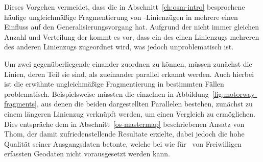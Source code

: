 \documentclass[../main/thesis.tex]{subfiles}
\begin{document}
Dieses Vorgehen vermeidet, dass die in Abschnitt~\ref{ch:osm-intro} besprochene häufige ungleichmäßige Fragmentierung von \osm-Linienzügen in mehrere  einen Einfluss auf den Generalisierungsvorgang hat.
Aufgrund der nicht immer gleichen Anzahl und Verteilung der  kommt es vor, dass ein  des einen Linienzugs mehreren  des anderen Linienzugs zugeordnet wird, was jedoch unproblematisch ist.


Um zwei gegenüberliegende  einander zuordnen zu können, müssen zunächst die Linien, deren Teil sie sind, als zueinander parallel erkannt werden.
Auch hierbei ist die erwähnte ungleichmäßige Fragmentierung in bestimmten Fällen problematisch.
Beispielsweise müssten die einzelnen  in Abbildung~\ref{fig:motorway-fragments}, aus denen die beiden dargestellten Parallelen bestehen, zunächst zu einem längeren Linienzug verknüpft werden, um einen Vergleich zu ermöglichen.
Dies entspräche dem in Abschnitt~\ref{os-mastermap} beschriebenen Ansatz von Thom, der damit zufriedenstellende Resultate erzielte, dabei jedoch die hohe Qualität seiner Ausgangsdaten betonte, welche bei wie für \osm\ von Freiwilligen erfassten Geodaten nicht vorausgesetzt werden kann.
\end{document}

